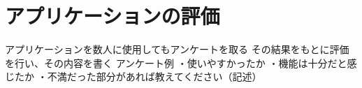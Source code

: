\documentclass[main]{subfiles}
\begin{document}
\chapter{アプリケーションの評価}
\label{cha:evaluation}



アプリケーションを数人に使用してもアンケートを取る
その結果をもとに評価を行い、その内容を書く
アンケート例
・使いやすかったか
・機能は十分だと感じたか
・不満だった部分があれば教えてください（記述）
\end{document}
